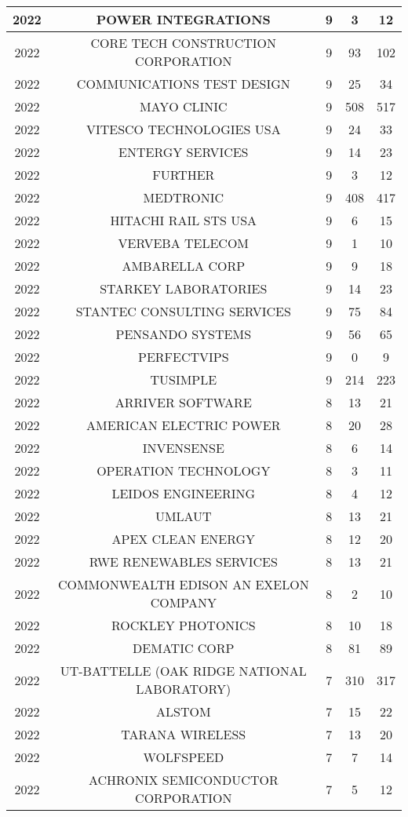 \documentclass{article}%
\begin{document}
\begin{longtable}{c|c|c|c|c}
2022&POWER INTEGRATIONS&9&3&12\\%
\hline%
2022&CORE TECH CONSTRUCTION CORPORATION&9&93&102\\%
\hline%
2022&COMMUNICATIONS TEST DESIGN&9&25&34\\%
\hline%
2022&MAYO CLINIC&9&508&517\\%
\hline%
2022&VITESCO TECHNOLOGIES USA&9&24&33\\%
\hline%
2022&ENTERGY SERVICES&9&14&23\\%
\hline%
2022&FURTHER&9&3&12\\%
\hline%
2022&MEDTRONIC&9&408&417\\%
\hline%
2022&HITACHI RAIL STS USA&9&6&15\\%
\hline%
2022&VERVEBA TELECOM&9&1&10\\%
\hline%
2022&AMBARELLA CORP&9&9&18\\%
\hline%
2022&STARKEY LABORATORIES&9&14&23\\%
\hline%
2022&STANTEC CONSULTING SERVICES&9&75&84\\%
\hline%
2022&PENSANDO SYSTEMS&9&56&65\\%
\hline%
2022&PERFECTVIPS&9&0&9\\%
\hline%
2022&TUSIMPLE&9&214&223\\%
\hline%
2022&ARRIVER SOFTWARE&8&13&21\\%
\hline%
2022&AMERICAN ELECTRIC POWER&8&20&28\\%
\hline%
2022&INVENSENSE&8&6&14\\%
\hline%
2022&OPERATION TECHNOLOGY&8&3&11\\%
\hline%
2022&LEIDOS ENGINEERING&8&4&12\\%
\hline%
2022&UMLAUT&8&13&21\\%
\hline%
2022&APEX CLEAN ENERGY&8&12&20\\%
\hline%
2022&RWE RENEWABLES SERVICES&8&13&21\\%
\hline%
2022&COMMONWEALTH EDISON AN EXELON COMPANY&8&2&10\\%
\hline%
2022&ROCKLEY PHOTONICS&8&10&18\\%
\hline%
2022&DEMATIC CORP&8&81&89\\%
\hline%
2022&UT{-}BATTELLE  (OAK RIDGE NATIONAL LABORATORY)&7&310&317\\%
\hline%
2022&ALSTOM&7&15&22\\%
\hline%
2022&TARANA WIRELESS&7&13&20\\%
\hline%
2022&WOLFSPEED&7&7&14\\%
\hline%
2022&ACHRONIX SEMICONDUCTOR CORPORATION&7&5&12\\%

\end{longtable}
\end{document}
